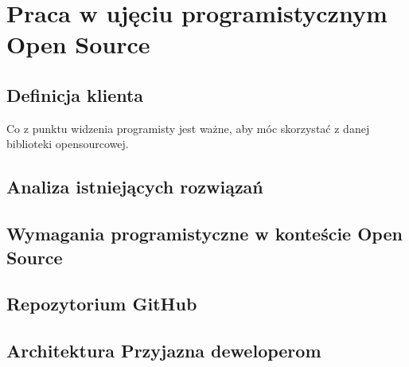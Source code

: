 \chapter{Praca w ujęciu programistycznym Open Source}

\section{Definicja klienta}

Co z punktu widzenia programisty jest ważne, aby móc skorzystać z danej biblioteki opensourcowej.

\section{Analiza istniejących rozwiązań}

\section{Wymagania programistyczne w konteście Open Source}

\section{Repozytorium GitHub}
\section{Architektura Przyjazna deweloperom}

